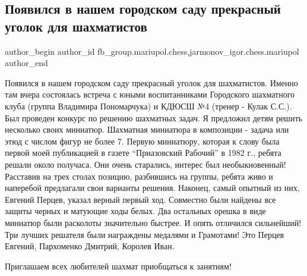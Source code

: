  
 
 
 
 

\subsection{Появился в нашем городском саду прекрасный уголок для шахматистов}
\label{sec:10_08_2018.fb.fb_group.mariupol.chess.1.poyavilsya_v_nashem_}
 
\ifcmt
 author_begin
   author_id fb_group.mariupol.chess,jarmonov_igor.chess.mariupol
 author_end
\fi

Появился в нашем городском саду прекрасный уголок для шахматистов. Именно там
вчера состоялась встреча с юными воспитанниками Городского шахматного клуба
(группа Владимира Пономарчука) и КДЮСШ №4 (тренер - Кулак С.С.). Был проведен
конкурс по решению шахматных задач. Я предложил детям решить несколько своих
миниатюр. Шахматная миниатюра в композиции - задача или этюд с числом фигур не
более 7. Первую миниатюру, которая к слову была первой моей публикацией в
газете \enquote{Приазовский Рабочий} в 1982 г., ребята решали около получаса.
Они очень старались, интерес был необыкновенный! Расставив на трех столах
позицию, разбившись на группы, ребята живо и наперебой предлагали свои варианты
решения.  Наконец, самый опытный из них, Евгений Перцев, указал верный первый
ход.  Совместно были найдены все защиты черных и матующие ходы белых. Два
остальных орешка в виде миниатюр были расколоты значительно быстрее. И опять
отличился сильнейший! Три лучших решателя были награждены медалями и Грамотами!
Это Перцев Евгений, Пархоменко Дмитрий, Королев Иван. 

Приглашаем всех любителей шахмат приобщаться к занятиям!
